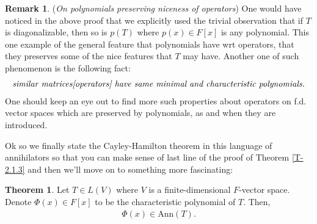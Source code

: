 \documentclass[letterpaper,11pt,twoside]{article}
\theoremstyle{definition}
\theoremstyle{definition}
\newtheorem{theorem}[proposition]{Theorem}
\theoremstyle{definition}
\newtheorem{remark}[proposition]{\textbf{Remark}}
\theoremstyle{definition}
\theoremstyle{definition}
\theoremstyle{definition}
\theoremstyle{remark}
\theoremstyle{definition}
\newcommand{\Ann}[1]{\text{Ann}\left(#1\right)}
\begin{document}
    \begin{remark}\label{R-2.1.5}
    (\textit{On polynomials preserving niceness of operators}) One would have noticed in the above proof that we explicitly used the trivial observation that if $T$ is diagonalizable, then so is $p(T)$ where $p(x) \in F[x]$ is any polynomial. This one example of the general feature that polynomials have wrt operators, that they preserves some of the nice features that $T$ may have. Another one of such phenomenon is the following fact:
    \begin{align*}
        \text{\textit{similar matrices[operators] have same minimal and characteristic polynomials.}}
    \end{align*}
    One should keep an eye out to find more such properties about operators on f.d. vector spaces which are preserved by polynomials, as and when they are introduced.
    \end{remark}
    Ok so we finally state the Cayley-Hamilton theorem in this language of annihilators so that you can make sense of last line of the proof of Theorem \ref{T-2.1.3} and then we'll move on to something more fascinating:
    \begin{theorem}\label{T-2.1.6}
        Let $T\in L(V)$ where $V$ is a finite-dimensional $F$-vector space. Denote $\Phi(x) \in F[x]$ to be the characteristic polynomial of $T$. Then, 
        \begin{align}
            \Phi(x) \in \Ann{T}.
        \end{align}
    \end{theorem}
\end{document}
